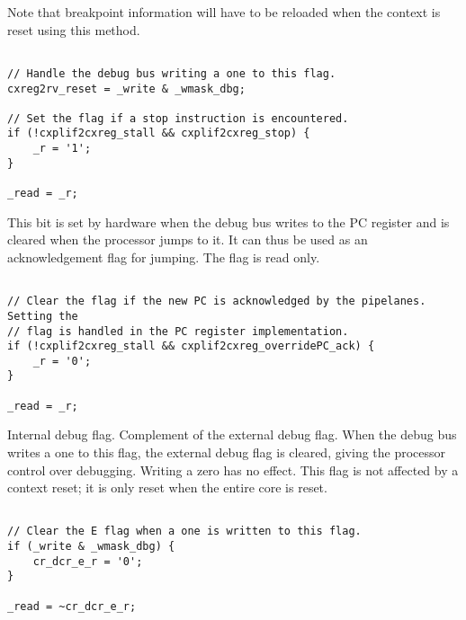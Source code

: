 Note that breakpoint information will have to be reloaded when the context is 
reset using this method.

\declaration{}
\implementation{}
\begin{lstlisting}

// Handle the debug bus writing a one to this flag.
cxreg2rv_reset = _write & _wmask_dbg;

// Set the flag if a stop instruction is encountered.
if (!cxplif2cxreg_stall && cxplif2cxreg_stop) {
    _r = '1';
}

_read = _r;
\end{lstlisting}

This bit is set by hardware when the debug bus writes to the PC register and is 
cleared when the processor jumps to it. It can thus be used as an acknowledgement
flag for jumping. The flag is read only.

\declaration{}
\implementation{}
\begin{lstlisting}

// Clear the flag if the new PC is acknowledged by the pipelanes. Setting the
// flag is handled in the PC register implementation.
if (!cxplif2cxreg_stall && cxplif2cxreg_overridePC_ack) {
    _r = '0';
}

_read = _r;
\end{lstlisting}

Internal debug flag. Complement of the external debug flag. When the debug bus 
writes a one to this flag, the external debug flag is cleared, giving the
processor control over debugging. Writing a zero has no effect. This flag is not
affected by a context reset; it is only reset when the entire core is reset.

\implementation{}
\begin{lstlisting}

// Clear the E flag when a one is written to this flag.
if (_write & _wmask_dbg) {
    cr_dcr_e_r = '0';
}

_read = ~cr_dcr_e_r;
\end{lstlisting}

